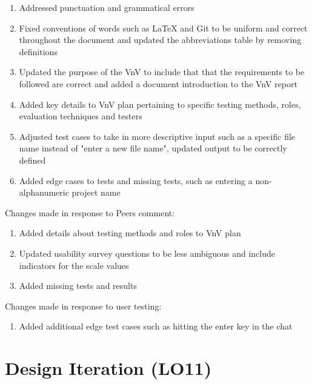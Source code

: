 \documentclass{article}
\begin{document}
	\begin{enumerate}
		\item Addressed punctuation and grammatical errors 
		\item Fixed conventions of words such as LaTeX and Git to be uniform and correct throughout the document and updated the abbreviations table by removing definitions
		\item Updated the purpose of the VnV to include that that the requirements to be followed are correct and added a document introduction to the VnV report
		\item Added key details to VnV plan pertaining to specific testing methods, roles, evaluation techniques and testers
		\item Adjusted test cases to take in more descriptive input such as a specific file name instead of "enter a new file name", updated output to be correctly defined
		\item Added edge cases to tests and missing tests, such as entering a non-alphanumeric project name
	\end{enumerate}
	
	\noindent Changes made in response to Peers comment:
	
	\begin{enumerate}
		\item Added details about testing methods and roles to VnV plan
		\item Updated usability survey questions to be less ambiguous and include indicators for the scale values
		\item Added missing tests and results
	\end{enumerate}
	
	\noindent Changes made in response to user testing:
	
	\begin{enumerate}
		\item Added additional edge test cases such as hitting the enter key in the chat
	\end{enumerate}
	
	\newpage
	
	\section{Design Iteration (LO11)}
	
	
\end{document}
